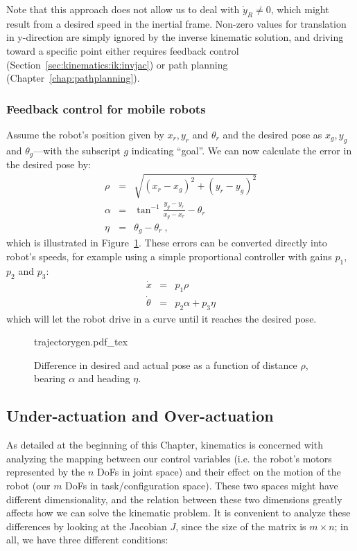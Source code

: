 Note that this approach does not allow us to deal with $\dot{y}_R \neq 0$, which might result from a desired speed in the inertial frame. Non-zero values for translation in y-direction are simply ignored by the inverse kinematic solution, and driving toward a specific point either requires feedback control (Section~\ref{sec:kinematics:ik:invjac}) or path planning (Chapter~\ref{chap:pathplanning}).


\subsubsection{Feedback control for mobile robots}\label{sec:fbmobile}

Assume the robot's position given by $x_r, y_r$ and $\theta_r$ and the desired pose as $x_g, y_g$ and $\theta_g$---with the subscript $g$ indicating ``goal''.
We can now calculate the error in the desired pose by:
\begin{eqnarray}
\rho  &=& \sqrt{(x_r-x_g)^2+(y_r-y_g)^2} \nonumber \\
\alpha&=& \tan^{-1}{\frac{y_g-y_r}{x_g-x_r}}-\theta_r \\
\eta  &=& \theta_g-\theta_r\ , \nonumber
\end{eqnarray}
which is illustrated in Figure~\ref{fig:trajectorygen}.
These errors can be converted directly into robot's speeds, for example using a simple proportional controller with gains $p_1$, $p_2$ and $p_3$:
\begin{eqnarray}
\dot{x} &=& p_1 \rho\\
\dot{\theta} &=& p_2 \alpha + p_3 \eta
\end{eqnarray}
which will let the robot drive in a curve until it reaches the desired pose.

\begin{figure}
    \centering
    \def\svgwidth{\textwidth}
    {trajectorygen.pdf_tex}
    \caption{Difference in desired and actual pose as a function of distance $\rho$, bearing $\alpha$ and heading $\eta$.}
    \label{fig:trajectorygen}
\end{figure}


\subsection{Under-actuation and Over-actuation}\label{sec:kinematics:diff:underover}

As detailed at the beginning of this Chapter, kinematics is concerned with analyzing the mapping between our control variables (i.e. the robot's motors represented by the $n$ DoFs in joint space) and their effect on the motion of the robot (our $m$ DoFs in task/configuration space). These two spaces might have different dimensionality, and the relation between these two dimensions greatly affects how we can solve the kinematic problem. It is convenient to analyze these differences by looking at the Jacobian $J$, since the size of the matrix is $m \times n$; in all, we have three different conditions:

